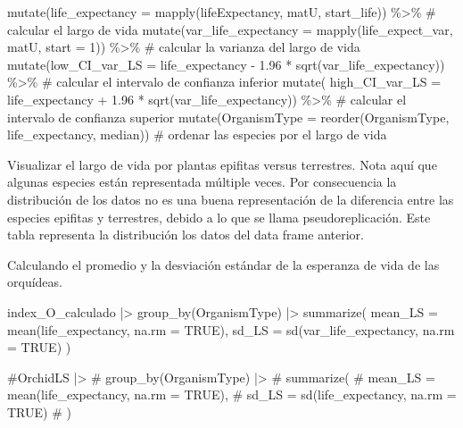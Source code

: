 \documentclass[
  12pt,
  letterpaper,
]{book}
\newenvironment{Shaded}{\begin{snugshade}}{\end{snugshade}}
\newcommand{\AttributeTok}[1]{\textcolor[rgb]{0.40,0.45,0.13}{#1}}
\newcommand{\CommentTok}[1]{\textcolor[rgb]{0.37,0.37,0.37}{#1}}
\newcommand{\ConstantTok}[1]{\textcolor[rgb]{0.56,0.35,0.01}{#1}}
\newcommand{\DecValTok}[1]{\textcolor[rgb]{0.68,0.00,0.00}{#1}}
\newcommand{\FloatTok}[1]{\textcolor[rgb]{0.68,0.00,0.00}{#1}}
\newcommand{\FunctionTok}[1]{\textcolor[rgb]{0.28,0.35,0.67}{#1}}
\newcommand{\NormalTok}[1]{\textcolor[rgb]{0.00,0.23,0.31}{#1}}
\newcommand{\SpecialCharTok}[1]{\textcolor[rgb]{0.37,0.37,0.37}{#1}}
\begin{document}
\begin{Shaded}
\begin{Highlighting}[]
  \FunctionTok{mutate}\NormalTok{(}\AttributeTok{life\_expectancy =} \FunctionTok{mapply}\NormalTok{(lifeExpectancy, matU, start\_life)) }\SpecialCharTok{\%\textgreater{}\%} \CommentTok{\# calcular el largo de vida}
  \FunctionTok{mutate}\NormalTok{(}\AttributeTok{var\_life\_expectancy =} \FunctionTok{mapply}\NormalTok{(life\_expect\_var, matU, }\AttributeTok{start =} \DecValTok{1}\NormalTok{)) }\SpecialCharTok{\%\textgreater{}\%} \CommentTok{\# calcular la varianza del largo de vida}
  \FunctionTok{mutate}\NormalTok{(}\AttributeTok{low\_CI\_var\_LS =}\NormalTok{ life\_expectancy }\SpecialCharTok{{-}} \FloatTok{1.96} \SpecialCharTok{*} \FunctionTok{sqrt}\NormalTok{(var\_life\_expectancy)) }\SpecialCharTok{\%\textgreater{}\%} \CommentTok{\# calcular el intervalo de confianza inferior}
  \FunctionTok{mutate}\NormalTok{(}
    \AttributeTok{high\_CI\_var\_LS =}\NormalTok{ life\_expectancy }\SpecialCharTok{+} \FloatTok{1.96} \SpecialCharTok{*} \FunctionTok{sqrt}\NormalTok{(var\_life\_expectancy)) }\SpecialCharTok{\%\textgreater{}\%} \CommentTok{\# calcular el intervalo de confianza superior}
  \FunctionTok{mutate}\NormalTok{(}\AttributeTok{OrganismType =} \FunctionTok{reorder}\NormalTok{(OrganismType, life\_expectancy, median)) }\CommentTok{\# ordenar las especies por el largo de vida}
\end{Highlighting}
\end{Shaded}

Visualizar el largo de vida por plantas epifitas versus terrestres. Nota
aquí que algunas especies están representada múltiple veces. Por
consecuencia la distribución de los datos no es una buena representación
de la diferencia entre las especies epifitas y terrestres, debido a lo
que se llama pseudoreplicación. Este tabla representa la distribución
los datos del data frame anterior.

Calculando el promedio y la desviación estándar de la esperanza de vida
de las orquídeas.

\begin{Shaded}
\begin{Highlighting}[]
\NormalTok{index\_O\_calculado }\SpecialCharTok{|\textgreater{}}
  \FunctionTok{group\_by}\NormalTok{(OrganismType) }\SpecialCharTok{|\textgreater{}}
  \FunctionTok{summarize}\NormalTok{(}
    \AttributeTok{mean\_LS =} \FunctionTok{mean}\NormalTok{(life\_expectancy, }\AttributeTok{na.rm =} \ConstantTok{TRUE}\NormalTok{),}
    \AttributeTok{sd\_LS =} \FunctionTok{sd}\NormalTok{(var\_life\_expectancy, }\AttributeTok{na.rm =} \ConstantTok{TRUE}\NormalTok{)}
\NormalTok{  )}


\CommentTok{\#OrchidLS |\textgreater{}}
\CommentTok{\#  group\_by(OrganismType) |\textgreater{}}
\CommentTok{\#  summarize(}
 \CommentTok{\#   mean\_LS = mean(life\_expectancy, na.rm = TRUE),}
 \CommentTok{\#   sd\_LS = sd(life\_expectancy, na.rm = TRUE)}
\CommentTok{\#  )}
\end{Highlighting}
\end{Shaded}
\end{document}
